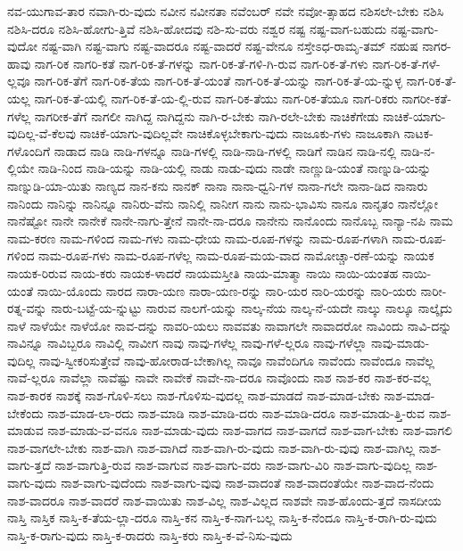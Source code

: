 {ನವ-ಯುಗಾವ-ತಾರ
ನವಾಗಿ-ರು-ವುದು
ನವೀನ
ನವೀನತಾ
ನವೆಂಬರ್
ನವೇ
ನವೋ-ತ್ಸಾಹದ
ನಶಿಸಲೇ-ಬೇಕು
ನಶಿಸಿ
ನಶಿಸಿ-ದರೂ
ನಶಿಸಿ-ಹೋಗು-ತ್ತಿವೆ
ನಶಿಸಿ-ಹೋದವು
ನಶಿ-ಸು-ವರು
ನಶ್ವರ
ನಷ್ಟ
ನಷ್ಟ-ವಾಗ-ಬಹುದು
ನಷ್ಟ-ವಾಗು-ವುದೋ
ನಷ್ಟ-ವಾಗಿ
ನಷ್ಟ-ವಾಗು
ನಷ್ಟ-ವಾದರೂ
ನಷ್ಟ-ವಾದರೆ
ನಷ್ಟ-ವೇನೂ
ನಸ್ತೇಽಧ-ರಾಮೃ-ತಮ್
ನಹುಷ
ನಾಗರ-ಹಾವು
ನಾಗ-ರಿಕ
ನಾಗರಿ-ಕತೆ
ನಾಗ-ರಿಕ-ತೆ-ಗಳನ್ನು
ನಾಗ-ರಿಕ-ತೆ-ಗಳಿ-ಗಿ-ರುವ
ನಾಗ-ರಿಕ-ತೆ-ಗಳು
ನಾಗ-ರಿಕ-ತೆ-ಗಳೆ-ಲ್ಲವೂ
ನಾಗ-ರಿಕ-ತೆಗೆ
ನಾಗ-ರಿಕ-ತೆಯ
ನಾಗ-ರಿಕ-ತೆ-ಯಂತೆ
ನಾಗ-ರಿಕ-ತೆ-ಯನ್ನು
ನಾಗ-ರಿಕ-ತೆ-ಯ-ನ್ನುಳ್ಳ
ನಾಗ-ರಿಕ-ತೆ-ಯಲ್ಲ
ನಾಗ-ರಿಕ-ತೆ-ಯಲ್ಲಿ
ನಾಗ-ರಿಕ-ತೆ-ಯ-ಲ್ಲಿ-ರುವ
ನಾಗ-ರಿಕ-ತೆಯು
ನಾಗ-ರಿಕ-ತೆಯೂ
ನಾಗ-ರಿಕರು
ನಾಗರೀ-ಕತೆ-ಗಳೆಲ್ಲ
ನಾಗರೀಕ-ತೆಗೆ
ನಾಗಲೀ
ನಾಗಿದ್ದ
ನಾಗಿದ್ದನು
ನಾಗಿ-ರ-ಬೇಕು
ನಾಗಿ-ರಲೇ-ಬೇಕು
ನಾಚಿಕೆಗೇಡು
ನಾಚಿಕೆ-ಯಾಗು-ವುದಿಲ್ಲ-ವೆ-ಕೆಲವು
ನಾಚಿಕೆ-ಯಾಗು-ವುದಿಲ್ಲವೇ
ನಾಚಿಕೊಳ್ಳಬೇಕಾಗು-ವುದು
ನಾಜೂಕು-ಗಳು
ನಾಜೂಕಾಗಿ
ನಾಟಕ-ಗಳೊಂದಿಗೆ
ನಾಡಾದ
ನಾಡಿ
ನಾಡಿ-ಗಳನ್ನೂ
ನಾಡಿ-ಗಳಲ್ಲಿ
ನಾಡಿ-ನಾಡಿ-ಗಳಲ್ಲಿ
ನಾಡಿಗೆ
ನಾಡಿನ
ನಾಡಿ-ನಲ್ಲಿ
ನಾಡಿ-ನ-ಲ್ಲಿಯೇ
ನಾಡಿ-ನಿಂದ
ನಾಡಿ-ಯನ್ನು
ನಾಡಿ-ಯಲ್ಲಿ
ನಾಡು
ನಾಡು-ವುದು
ನಾಡೇ
ನಾಣ್ಣುಡಿ-ಯಂತೆ
ನಾಣ್ನುಡಿ-ಯನ್ನು
ನಾಣ್ನುಡಿ-ಯಾ-ಯಿತು
ನಾಣ್ಯದ
ನಾನ-ಕನು
ನಾನಕ್
ನಾನಾ
ನಾನಾ-ಧ್ವನಿ-ಗಳ
ನಾನಾ-ಗಲೇ
ನಾನಾ-ಡಿದ
ನಾನಾರು
ನಾನಿಂದು
ನಾನಿನ್ನು
ನಾನಿನ್ನೂ
ನಾನಿರು-ವೆನು
ನಾನಿಲ್ಲಿ
ನಾನೀಗ
ನಾನು
ನಾನು-ಭಾವಿಸು
ನಾನೂ
ನಾನೃತಂ
ನಾನೆಲ್ಲೋ
ನಾನೆಷ್ಟೋ
ನಾನೇ
ನಾನೇಕೆ
ನಾನೇ-ನಾಗು-ತ್ತೇನೆ
ನಾನೇ-ನಾ-ದರೂ
ನಾನೇನು
ನಾನೊಂದು
ನಾನೊಬ್ಬ
ನಾನ್ಯಾ-ನಪಿ
ನಾಮ
ನಾಮ-ಕರಣ
ನಾಮ-ಗಳಿಂದ
ನಾಮ-ಗಳು
ನಾಮ-ಧೇಯ
ನಾಮ-ರೂಪ-ಗಳನ್ನು
ನಾಮ-ರೂಪ-ಗಳಾಗಿ
ನಾಮ-ರೂಪ-ಗಳಿಂದ
ನಾಮ-ರೂಪ-ಗಳು
ನಾಮ-ರೂಪ-ಗಳೆಲ್ಲ
ನಾಮ-ರೂಪ-ಮಯ-ವಾದ
ನಾಮೋಚ್ಚಾ-ರಣೆ-ಯನ್ನು
ನಾಯಕ
ನಾಯಕ-ರಿರುವ
ನಾಯ-ಕರು
ನಾಯಕ-ಳಾದರೆ
ನಾಯಮಸ್ತೀತಿ
ನಾಯ-ಮಾತ್ಮಾ
ನಾಯಿ
ನಾಯಿ-ಯಂತಹ
ನಾಯಿ-ಯಂತೆ
ನಾಯಿ-ಯೊಂದು
ನಾರದ
ನಾರಾ-ಯಣ
ನಾರಾ-ಯಣ-ರನ್ನು
ನಾರಿ-ಯರ
ನಾರಿ-ಯರನ್ನು
ನಾರಿ-ಯರು
ನಾರೀ-ರತ್ನ-ವನ್ನು
ನಾರು-ಬಟ್ಟೆ-ಯ-ನ್ನುಟ್ಟು
ನಾರುವ
ನಾಲಗೆ-ಯನ್ನು
ನಾಲ್ಕ-ನೆಯ
ನಾಲ್ಕ-ನೆ-ಯದೇ
ನಾಲ್ಕು
ನಾಲ್ಕೂ
ನಾಲ್ಕೈದು
ನಾಳೆ
ನಾಳೆಯೇ
ನಾಳೆಯೋ
ನಾವ-ದನ್ನು
ನಾವರಿ-ಯಲು
ನಾವವತು
ನಾವಾಗಲೇ
ನಾವಾದರೋ
ನಾವಿಂದು
ನಾವಿ-ದನ್ನು
ನಾವಿನ್ನೂ
ನಾವಿಬ್ಬರೂ
ನಾವಿಲ್ಲಿ
ನಾವೀಗ
ನಾವು
ನಾವು-ಗಳೆಲ್ಲ
ನಾವು-ಗಳೆ-ಲ್ಲರೂ
ನಾವು-ಗಳೆಲ್ಲಾ
ನಾವು-ಮಾಡು-ವುದಿಲ್ಲ
ನಾವು-ಸ್ವೀಕರಿಸುತ್ತೇವೆ
ನಾವು-ಹೋರಾಡ-ಬೇಕಾಗಿಲ್ಲ
ನಾವೂ
ನಾವೆಂದಿಗೂ
ನಾವೆಂದು
ನಾವೆಂದೂ
ನಾವೆಲ್ಲ
ನಾವೆ-ಲ್ಲರೂ
ನಾವೆಲ್ಲಾ
ನಾವೆಷ್ಟು
ನಾವೇ
ನಾವೇಕೆ
ನಾವೇ-ನಾ-ದರೂ
ನಾವೊಂದು
ನಾಶ
ನಾಶ-ಕರ
ನಾಶ-ಕರ-ವಲ್ಲ
ನಾಶ-ಕಾರಕ
ನಾಶಕ್ಕೆ
ನಾಶ-ಗೊಳಿ-ಸಲು
ನಾಶ-ಗೊಳಿಸು-ವುದಲ್ಲ
ನಾಶ-ಮಾಡದೆ
ನಾಶ-ಮಾಡ-ಬೇಕು
ನಾಶ-ಮಾಡ-ಬೇಕೆಂದು
ನಾಶ-ಮಾಡ-ಲಾ-ರದು
ನಾಶ-ಮಾಡಿ
ನಾಶ-ಮಾಡಿ-ದರು
ನಾಶ-ಮಾಡಿ-ದರೂ
ನಾಶ-ಮಾಡು-ತ್ತಿ-ರುವ
ನಾಶ-ಮಾಡುವ
ನಾಶ-ಮಾಡು-ವ-ವನೂ
ನಾಶ-ಮಾಡು-ವುದು
ನಾಶ-ವಾಗದ
ನಾಶ-ವಾಗದೆ
ನಾಶ-ವಾಗ-ಬೇಕು
ನಾಶ-ವಾಗಲಿ
ನಾಶ-ವಾಗಲೇ-ಬೇಕು
ನಾಶ-ವಾಗಿ
ನಾಶ-ವಾಗಿದೆ
ನಾಶ-ವಾಗಿ-ರು-ವುದು
ನಾಶ-ವಾಗಿ-ರು-ವುವು
ನಾಶ-ವಾಗಿಲ್ಲ
ನಾಶ-ವಾಗು-ತ್ತದೆ
ನಾಶ-ವಾಗುತ್ತಿ-ರುವ
ನಾಶ-ವಾಗುವ
ನಾಶ-ವಾಗು-ವರು
ನಾಶ-ವಾಗು-ವಿರಿ
ನಾಶ-ವಾಗು-ವುದಿಲ್ಲ
ನಾಶ-ವಾಗು-ವುದು
ನಾಶ-ವಾಗು-ವುದೆಂದು
ನಾಶ-ವಾಗು-ವುವು
ನಾಶ-ವಾದಂತೆ
ನಾಶ-ವಾದಂತೆಯೇ
ನಾಶ-ವಾದ-ನೆಂದು
ನಾಶ-ವಾದರೂ
ನಾಶ-ವಾದರೆ
ನಾಶ-ವಾಯಿತು
ನಾಶ-ವಿಲ್ಲ
ನಾಶ-ವಿಲ್ಲದ
ನಾಶವೇ
ನಾಶ-ಹೊಂದು-ತ್ತದೆ
ನಾಸದೀಯ
ನಾಸ್ತಿ
ನಾಸ್ತಿಕ
ನಾಸ್ತಿ-ಕ-ತೆಯ-ಲ್ಲಾ-ದರೂ
ನಾಸ್ತಿ-ಕನ
ನಾಸ್ತಿ-ಕ-ನಾಗ-ಬಲ್ಲ
ನಾಸ್ತಿ-ಕ-ನೆಂದೂ
ನಾಸ್ತಿ-ಕ-ರಾಗಿ-ರು-ವುದು
ನಾಸ್ತಿ-ಕ-ರಾಗು-ವುದು
ನಾಸ್ತಿ-ಕ-ರಾದರು
ನಾಸ್ತಿ-ಕರು
ನಾಸ್ತಿ-ಕ-ವೆ-ನಿಸು-ವುದು
}
